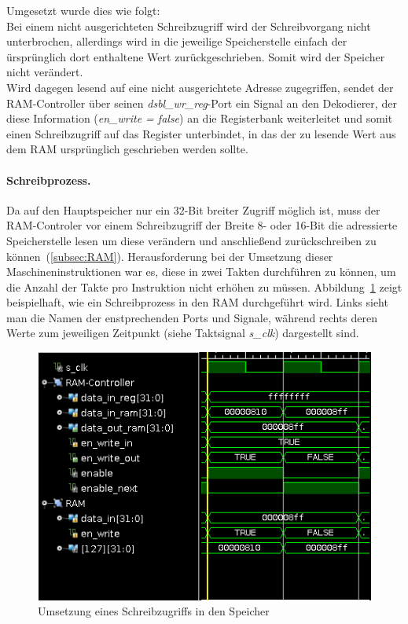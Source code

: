 Umgesetzt wurde dies wie folgt:\\
Bei einem nicht ausgerichteten Schreibzugriff wird der Schreibvorgang nicht unterbrochen, allerdings wird in die jeweilige Speicherstelle einfach der ürsprünglich dort enthaltene Wert zurückgeschrieben.
Somit wird der Speicher nicht verändert.\\
Wird dagegen lesend auf eine nicht ausgerichtete Adresse zugegriffen, sendet der RAM-Controller über seinen \textit{dsbl\_wr\_reg}-Port ein Signal an den Dekodierer, der diese Information (\textit{en\_write = false}) an die Registerbank weiterleitet und somit einen Schreibzugriff auf das Register unterbindet, in das der zu lesende Wert aus dem RAM ursprünglich geschrieben werden sollte.

\paragraph{Schreibprozess.} 
Da auf den Hauptspeicher nur ein 32-Bit breiter Zugriff möglich ist, muss der RAM-Controler vor einem Schreibzugriff der Breite 8- oder 16-Bit die adressierte Speicherstelle lesen um diese verändern und anschließend zurückschreiben zu können~(\ref{subsec:RAM}).
Herausforderung bei der Umsetzung dieser Maschineninstruktionen war es, diese in zwei Takten durchführen zu können, um die Anzahl der Takte pro Instruktion nicht erhöhen zu müssen.
Abbildung~\ref{fig:write} zeigt beispielhaft, wie ein Schreibprozess in den RAM durchgeführt wird.
Links sieht man die Namen der enstprechenden Ports und Signale, während rechts deren Werte zum jeweiligen Zeitpunkt (siehe Taktsignal \textit{s\_clk}) dargestellt sind.

\begin{figure}[htpb]
    \includegraphics[width=\textwidth]{Figures/write.png}
    \caption{Umsetzung eines Schreibzugriffs in den Speicher}
    \label{fig:write}
\end{figure}

